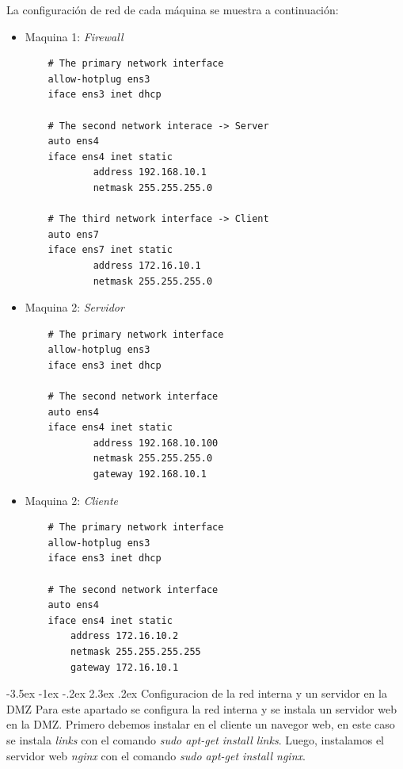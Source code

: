 \documentclass[11pt]{report} %
\makeatletter
\renewcommand\chapter{\@startsection{chapter}{0}{\z@}%
    {-3.5ex \@plus -1ex \@minus -.2ex}%
    {2.3ex \@plus.2ex}%
    {\normalfont\Large\bfseries}}
\makeatother
\begin{document}
La configuración de red de cada máquina se muestra a continuación:
\begin{itemize}
  \item Maquina 1: \emph{Firewall}
  \begin{verbatim}
    # The primary network interface
    allow-hotplug ens3
    iface ens3 inet dhcp
    
    # The second network interace -> Server
    auto ens4
    iface ens4 inet static
            address 192.168.10.1
            netmask 255.255.255.0
    
    # The third network interface -> Client
    auto ens7
    iface ens7 inet static
            address 172.16.10.1
            netmask 255.255.255.0
  \end{verbatim}

  \item Maquina 2: \emph{Servidor}
  \begin{verbatim}
    # The primary network interface
    allow-hotplug ens3
    iface ens3 inet dhcp

    # The second network interface
    auto ens4
    iface ens4 inet static
            address 192.168.10.100
            netmask 255.255.255.0
            gateway 192.168.10.1
  \end{verbatim}

  \item Maquina 2: \emph{Cliente}
  \begin{verbatim}
    # The primary network interface
    allow-hotplug ens3
    iface ens3 inet dhcp

    # The second network interface
    auto ens4
    iface ens4 inet static
        address 172.16.10.2
        netmask 255.255.255.255
        gateway 172.16.10.1
  \end{verbatim}
\end{itemize}

\cleardoublepage

\chapter{Configuracion de la red interna y un servidor en la DMZ}
Para este apartado se configura la red interna y se instala un servidor web en la DMZ. 
Primero debemos instalar en el cliente un navegor web, en este caso se instala \emph{links} 
con el comando \emph{sudo apt-get install links}. Luego, instalamos el servidor web \emph{nginx}
con el comando \emph{sudo apt-get install nginx}. 
\end{document}
